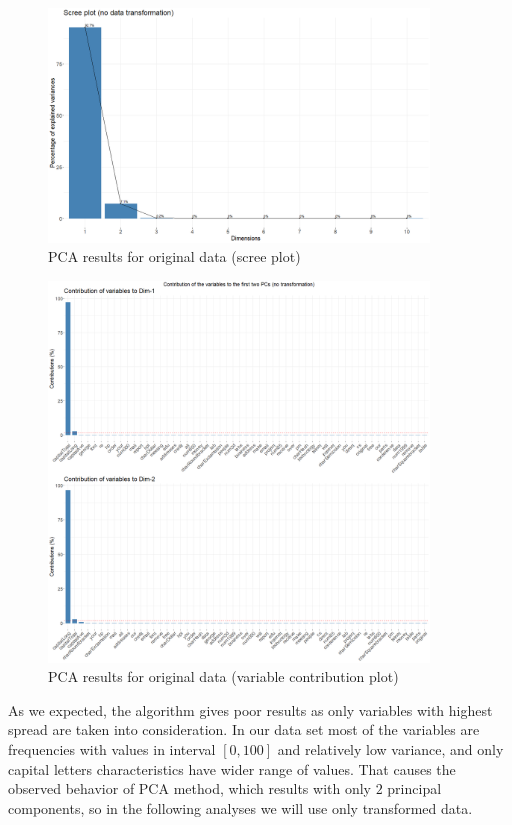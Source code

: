 \documentclass{article}
\begin{document}
	\begin{figure}[h]
		\centering
		\includegraphics[width=0.9\textwidth]{proj2_plots/screeplot1.png}
		\caption{PCA results for original data (scree plot)}
		\label{fig::screeplot}
	\end{figure}
	
	\begin{figure}[h]
		\centering
		\includegraphics[width=0.9\textwidth]{proj2_plots/varplot1.png}
		\caption{PCA results for original data (variable contribution plot)}
		\label{fig::varplot}
	\end{figure}
	
 	
	As we expected, the algorithm gives poor results as only variables with highest spread are taken into consideration. In our data set most of the variables are frequencies with values in interval $[0, 100]$ and relatively low variance, and only capital letters characteristics have wider range of values. That causes the observed  behavior of PCA method, which results with only $2$ principal components, so in the following analyses we will use only transformed data.
	
\end{document}
